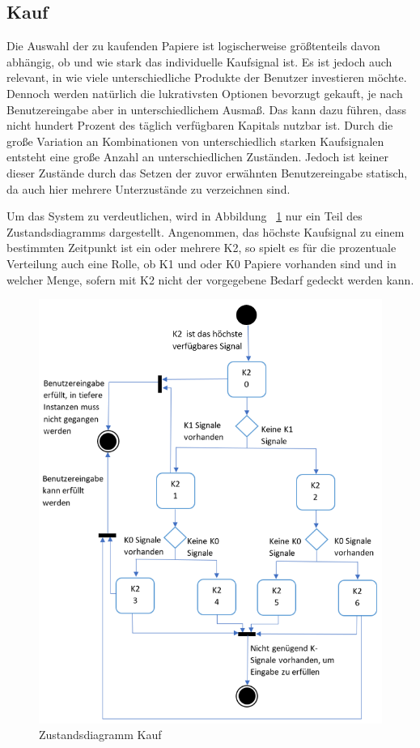 \subsection{Kauf}
Die Auswahl der zu kaufenden Papiere ist logischerweise größtenteils davon abhängig, ob und wie stark das individuelle Kaufsignal ist. Es ist jedoch auch relevant, in wie viele unterschiedliche Produkte der Benutzer investieren möchte. Dennoch werden natürlich die lukrativsten Optionen bevorzugt gekauft, je nach Benutzereingabe aber in unterschiedlichem Ausmaß. Das kann dazu führen, dass nicht hundert Prozent des täglich verfügbaren Kapitals nutzbar ist. Durch die große Variation an Kombinationen von unterschiedlich starken Kaufsignalen entsteht eine große Anzahl an unterschiedlichen Zuständen. Jedoch ist keiner dieser Zustände durch das Setzen der zuvor erwähnten Benutzereingabe statisch, da auch hier mehrere Unterzustände zu verzeichnen sind.

Um das System zu verdeutlichen, wird in Abbildung ~\ref{diagrammK} nur ein Teil des Zustandsdiagramms dargestellt. Angenommen, das höchste Kaufsignal zu einem bestimmten Zeitpunkt ist ein oder mehrere K2, so spielt es für die prozentuale Verteilung auch eine Rolle, ob K1 und oder K0 Papiere vorhanden sind und in welcher Menge, sofern mit K2 nicht der vorgegebene Bedarf gedeckt werden kann.

\begin{figure}[h]
  \centering
  \includegraphics[width=\linewidth]{diagrammKauf}
  \caption{Zustandsdiagramm Kauf}
  \label{diagrammK}
\end{figure}





